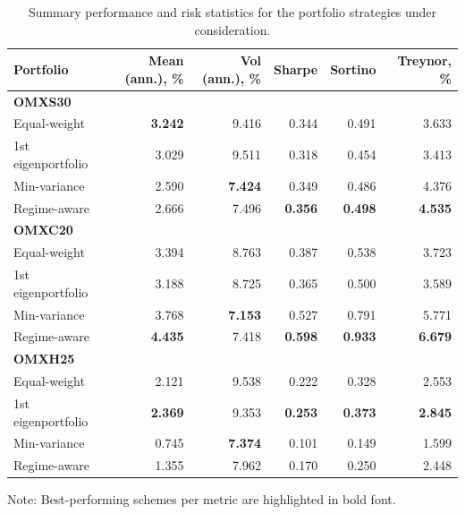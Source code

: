\begin{table}
    \centering
    \caption{Summary performance and risk statistics for the portfolio strategies under consideration.}
    \label{tab:summary_performance}
    \footnotesize
    \begin{tabular}{lrrrrr}
        \hline
     \textbf{Portfolio}  & \textbf{Mean (ann.), \%} & \textbf{Vol (ann.), \%} & \textbf{Sharpe} & \textbf{Sortino} & \textbf{Treynor, \%}\\
        \hline
    \textbf{OMXS30} & & & & & \\
Equal-weight & \textbf{3.242} & 9.416 & 0.344 & 0.491 & 3.633 \\
1st eigenportfolio & 3.029 & 9.511 & 0.318 & 0.454 & 3.413 \\
Min-variance & 2.590 & \textbf{7.424} & 0.349 & 0.486 & 4.376 \\
Regime-aware & 2.666 & 7.496 & \textbf{0.356} & \textbf{0.498} & \textbf{4.535} \\
        \hline
    \textbf{OMXC20} & & & & & \\
Equal-weight & 3.394 & 8.763 & 0.387 & 0.538 & 3.723 \\
1st eigenportfolio & 3.188 & 8.725 & 0.365 & 0.500 & 3.589 \\
Min-variance & 3.768 & \textbf{7.153} & 0.527 & 0.791 & 5.771 \\
Regime-aware & \textbf{4.435} & 7.418 & \textbf{0.598} & \textbf{0.933} & \textbf{6.679} \\
        \hline
    \textbf{OMXH25} & & & & & \\
Equal-weight & 2.121 & 9.538 & 0.222 & 0.328 & 2.553 \\
1st eigenportfolio & \textbf{2.369} & 9.353 & \textbf{0.253} & \textbf{0.373} & \textbf{2.845} \\
Min-variance & 0.745 & \textbf{7.374} & 0.101 & 0.149 & 1.599 \\
Regime-aware & 1.355 & 7.962 & 0.170 & 0.250 & 2.448 \\
        \hline
    \end{tabular}

    Note: Best-performing schemes per metric are highlighted in bold font.
\end{table}
